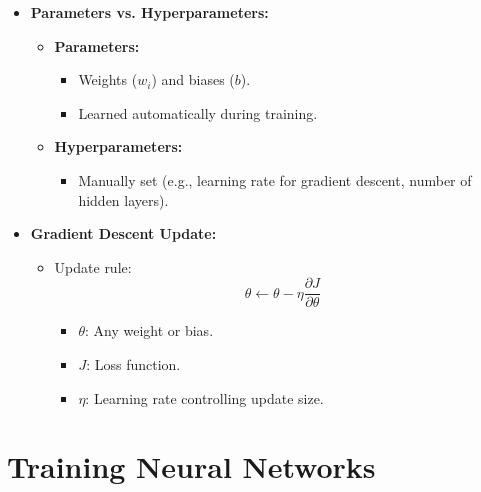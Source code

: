 \documentclass{article}
\begin{document}
\begin{itemize}
    \item \textbf{Parameters vs. Hyperparameters:}
    \begin{itemize}
        \item \textbf{Parameters:}
        \begin{itemize}
            \item Weights (\(w_i\)) and biases (\(b\)).
            \item Learned automatically during training.
        \end{itemize}
        \item \textbf{Hyperparameters:}
        \begin{itemize}
            \item Manually set (e.g., learning rate for gradient descent, number of hidden layers).
        \end{itemize}
    \end{itemize}
    
    \item \textbf{Gradient Descent Update:}
    \begin{itemize}
        \item Update rule:
        \[
        \theta \leftarrow \theta - \eta \frac{\partial J}{\partial \theta}
        \]
        \begin{itemize}
            \item \(\theta\): Any weight or bias.
            \item \(J\): Loss function.
            \item \(\eta\): Learning rate controlling update size.
        \end{itemize}
    \end{itemize}
\end{itemize}

\section{Training Neural Networks}
\end{document}
